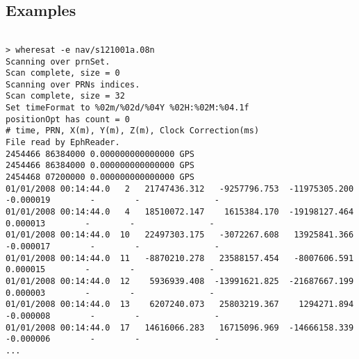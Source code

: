 \subsection{Examples}
\begin{\outputsize}
\begin{lstlisting}

> wheresat -e nav/s121001a.08n
Scanning over prnSet.
Scan complete, size = 0
Scanning over PRNs indices.
Scan complete, size = 32
Set timeFormat to %02m/%02d/%04Y %02H:%02M:%04.1f
positionOpt has count = 0
# time, PRN, X(m), Y(m), Z(m), Clock Correction(ms)
File read by EphReader.
2454466 86384000 0.000000000000000 GPS
2454466 86384000 0.000000000000000 GPS
2454468 07200000 0.000000000000000 GPS
01/01/2008 00:14:44.0   2   21747436.312   -9257796.753  -11975305.200  -0.000019        -        -               -
01/01/2008 00:14:44.0   4   18510072.147    1615384.170  -19198127.464   0.000013        -        -               -
01/01/2008 00:14:44.0  10   22497303.175   -3072267.608   13925841.366  -0.000017        -        -               -
01/01/2008 00:14:44.0  11   -8870210.278   23588157.454   -8007606.591   0.000015        -        -               -
01/01/2008 00:14:44.0  12    5936939.408  -13991621.825  -21687667.199   0.000003        -        -               -
01/01/2008 00:14:44.0  13    6207240.073   25803219.367    1294271.894  -0.000008        -        -               -
01/01/2008 00:14:44.0  17   14616066.283   16715096.969  -14666158.339  -0.000006        -        -               -
...


\end{lstlisting}
\end{\outputsize}


%

